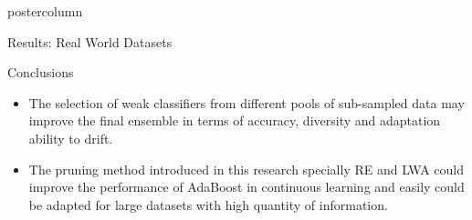 \documentclass[final]{beamer}
\begin{document}
\begin{frame}
\begin{columns}
\begin{column}{.49\textwidth}
\begin{beamercolorbox}[center,wd=\textwidth]{postercolumn}
\begin{minipage}[T]{.95\textwidth}
{\begin{block}{Results: Real World Datasets}
            \end{block}
            \vfill
            \begin{block}{Conclusions}
              \begin{itemize}
              \item The selection of weak classifiers from different pools of sub-sampled data may improve the final ensemble in terms of accuracy, diversity and adaptation ability to drift. 
              \item The pruning method introduced in this research specially RE and LWA could improve the performance of AdaBoost in continuous learning and easily could be adapted for large datasets with high quantity of information. 
         

\end{itemize}
\end{block}}
\end{minipage}
\end{beamercolorbox}
\end{column}
\end{columns}
\end{frame}
\end{document}
